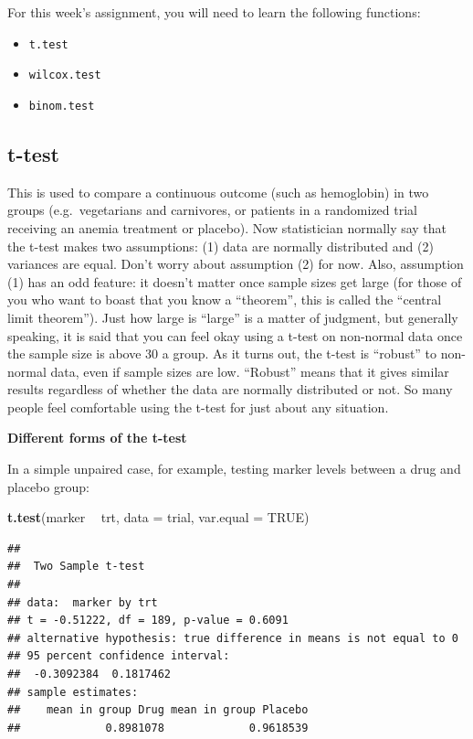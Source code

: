 \documentclass[]{book}
\newenvironment{Shaded}{\begin{snugshade}}{\end{snugshade}}
\newcommand{\DataTypeTok}[1]{\textcolor[rgb]{0.13,0.29,0.53}{#1}}
\newcommand{\KeywordTok}[1]{\textcolor[rgb]{0.13,0.29,0.53}{\textbf{#1}}}
\newcommand{\NormalTok}[1]{#1}
\newcommand{\OperatorTok}[1]{\textcolor[rgb]{0.81,0.36,0.00}{\textbf{#1}}}
\newcommand{\OtherTok}[1]{\textcolor[rgb]{0.56,0.35,0.01}{#1}}
\newcommand{\StringTok}[1]{\textcolor[rgb]{0.31,0.60,0.02}{#1}}
\providecommand{\tightlist}{%
  \setlength{\itemsep}{0pt}\setlength{\parskip}{0pt}}
\begin{document}
For this week's assignment, you will need to learn the following
functions:

\begin{itemize}
\tightlist
\item
  \texttt{t.test}
\item
  \texttt{wilcox.test}
\item
  \texttt{binom.test}
\end{itemize}

\hypertarget{t-test}{%
\subsection{\texorpdfstring{\textbf{t-test}}{t-test}}\label{t-test}}

This is used to compare a continuous outcome (such as hemoglobin) in two
groups (e.g.~vegetarians and carnivores, or patients in a randomized
trial receiving an anemia treatment or placebo). Now statistician
normally say that the t-test makes two assumptions: (1) data are
normally distributed and (2) variances are equal. Don't worry about
assumption (2) for now. Also, assumption (1) has an odd feature: it
doesn't matter once sample sizes get large (for those of you who want to
boast that you know a ``theorem'', this is called the ``central limit
theorem''). Just how large is ``large'' is a matter of judgment, but
generally speaking, it is said that you can feel okay using a t-test on
non-normal data once the sample size is above 30 a group. As it turns
out, the t-test is ``robust'' to non-normal data, even if sample sizes
are low. ``Robust'' means that it gives similar results regardless of
whether the data are normally distributed or not. So many people feel
comfortable using the t-test for just about any situation.

\textbf{Different forms of the t-test}

In a simple unpaired case, for example, testing marker levels between a
drug and placebo group:

\begin{Shaded}
\begin{Highlighting}[]
\KeywordTok{t.test}\NormalTok{(marker }\OperatorTok{~}\StringTok{ }\NormalTok{trt, }\DataTypeTok{data =}\NormalTok{ trial, }\DataTypeTok{var.equal =} \OtherTok{TRUE}\NormalTok{)}
\end{Highlighting}
\end{Shaded}

\begin{verbatim}
## 
##  Two Sample t-test
## 
## data:  marker by trt
## t = -0.51222, df = 189, p-value = 0.6091
## alternative hypothesis: true difference in means is not equal to 0
## 95 percent confidence interval:
##  -0.3092384  0.1817462
## sample estimates:
##    mean in group Drug mean in group Placebo 
##             0.8981078             0.9618539
\end{verbatim}
\end{document}
